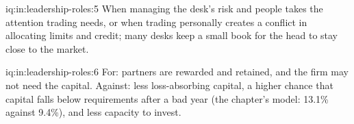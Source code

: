 \begin{solution}{iq:in:leadership-roles:5}
When managing the desk's risk and people takes the attention trading needs, or when trading personally creates a conflict
in allocating limits and credit; many desks keep a small book for the head to stay close to the market.
\end{solution}

\begin{solution}{iq:in:leadership-roles:6}
For: partners are rewarded and retained, and the firm may not need the capital. Against: less loss-absorbing capital, a
higher chance that capital falls below requirements after a bad year (the chapter's model: 13.1\% against 9.4\%), and
less capacity to invest.
\end{solution}
